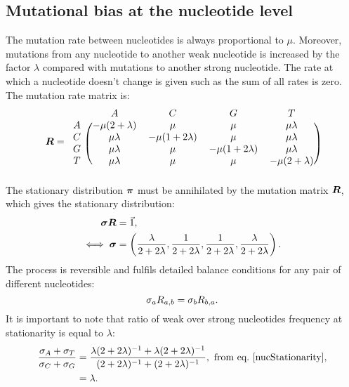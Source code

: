 \subsection{Mutational bias at the nucleotide level}
\label{sec:mut-bias-mut-matrix}
The mutation rate between nucleotides is always proportional to $\mu$.
Moreover, mutations from any nucleotide to another weak nucleotide is increased by the factor $\lambda$ compared with mutations to another strong nucleotide.
The rate at which a nucleotide doesn't change is given such as the sum of all rates is zero.
The mutation rate matrix is:
\begin{equation}
    \label{nucMatrix}
    \Mutmatrix =
    \begin{blockarray}{ccccc}
        & A & C & G & T \\
        \begin{block}{c(cccc)}
            A & {-\mu(2 + \lambda)} & {\mu} & {\mu} & {\mu \lambda} \\
            C & {\mu \lambda} & {-\mu(1 + 2\lambda)} & {\mu} & {\mu \lambda} \\
            G & {\mu \lambda} & {\mu} & {-\mu(1 + 2\lambda)} & {\mu \lambda} \\
            T & {\mu \lambda} & {\mu} & {\mu} & {-\mu(2 + \lambda)} \\
        \end{block}
    \end{blockarray}
\end{equation}
The stationary distribution $ \bm{\pi}$ must be annihilated by the mutation matrix $\bm{R}$, which gives the stationary distribution:
\begin{align}
    \bm{\sigma} \bm{R} & = \vec{1}, \\
    \iff \bm{\sigma} & = \left( \dfrac{\lambda}{2+2\lambda}, \dfrac{1}{2+2\lambda}, \dfrac{1}{2+2\lambda}, \dfrac{\lambda}{2+2\lambda} \right).
    \label{nucStationarity}
\end{align}
The process is reversible and fulfils detailed balance conditions for any pair of different nucleotides:
\begin{equation}
    \sigma_a R_{a, b} =\sigma_b R_{b, a}.
    \label{nucMutBalance}
\end{equation}
It is important to note that ratio of weak over strong nucleotides frequency at stationarity is equal to $\lambda$:
\begin{align}
    \label{lambda}
    \dfrac{ \mutequi_A + \mutequi_T }{ \mutequi_C + \mutequi_G }
    & = \dfrac{ \lambda ( 2 + 2 \lambda)^{-1} + \lambda ( 2 + 2 \lambda)^{-1}}{ ( 2 + 2 \lambda)^{-1} + ( 2 + 2 \lambda)^{-1}}, \ \text{from eq.~\ref{nucStationarity},}\\
    & = \lambda.
\end{align}

